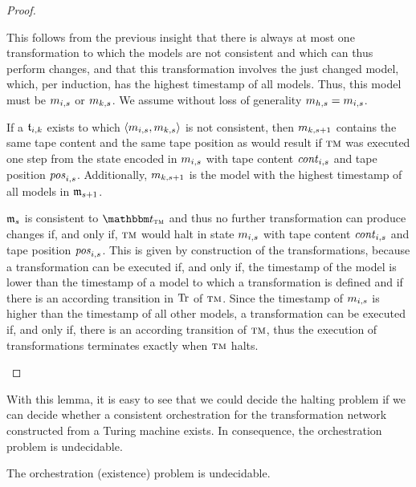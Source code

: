 \begin{proof}
\begin{longenumerate}
            This follows from the previous insight that there is always at most one transformation to which the models are not consistent and which can thus perform changes, and that this transformation involves the just changed model, which, per induction, has the highest timestamp of all models.
            Thus, this model must be $\model{m}{i,s}$ or $\model{m}{k,s}$.
            We assume without loss of generality $\model{m}{h,s} = \model{m}{i,s}$.            
		 \item
            If a $\transformation{t}_{i,k}$ exists to which $\tupled{\model{m}{i,s},\model{m}{k,s}}$ is not consistent, then $\model{m}{k,s+1}$ contains the same tape content and the same tape position as would result if $\textsc{tm}$ was executed one step from the state encoded in $\model{m}{i,s}$ with tape content $\mathit{cont}_{i,s}$ and tape position $\mathit{pos}_{i,s}$.
		 	Additionally, $\model{m}{k,s+1}$ is the model with the highest timestamp of all models in $\modeltuple{m}_{s+1}$.
		 \item 
             $\modeltuple{m}_{s}$ is consistent to $\transformationset{T}_{\TuringMachine}$ and thus no further transformation can produce changes if, and only if, $\textsc{tm}$ would halt in state $\model{m}{i,s}$ with tape content $\mathit{cont}_{i,s}$ and tape position $\mathit{pos}_{i,s}$.
             This is given by construction of the transformations, because a transformation can be executed if, and only if, the timestamp of the model is lower than the timestamp of a model to which a transformation is defined and if there is an according transition in $\operatorname{Tr}$ of $\textsc{tm}$.
             Since the timestamp of $\model{m}{i,s}$ is higher than the timestamp of all other models, a transformation can be executed if, and only if, there is an according transition of $\textsc{tm}$, thus the execution of transformations terminates exactly when $\textsc{tm}$ halts.
		 	\qedhere
	\end{longenumerate}
\end{proof}

With this lemma, it is easy to see that we could decide the halting problem if we can decide whether a consistent orchestration for the transformation network constructed from a Turing machine exists.
In consequence, the orchestration problem is undecidable.

\begin{theorem} \label{theorem:orchestration_problem_undecidability}
    The orchestration (existence) problem is undecidable.
\end{theorem}

